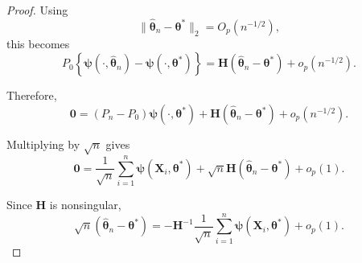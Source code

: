 \documentclass[pdflatex,sn-mathphys-ay]{sn-jnl}%
\let\oldtheta\theta
\renewcommand{\theta}{\boldsymbol{\oldtheta}}
\let\oldalpha\alpha
\renewcommand{\alpha}{\boldsymbol{\oldalpha}}
\theoremstyle{thmstyleone}%
\newtheorem{theorem}{Theorem}%
\theoremstyle{thmstyletwo}%
\theoremstyle{thmstylethree}%
\begin{document}
\begin{proof}
Using
\[
    \|
        \widehat{\boldsymbol{\theta}}_n
        -
        \boldsymbol{\theta}^*
    \|_2
    =
    O_p(n^{-1/2}),
\]
this becomes
\[
    P_0
    \left\{
        \boldsymbol{\psi}
        (\cdot,\widehat{\boldsymbol{\theta}}_n)
        -
        \boldsymbol{\psi}
        (\cdot,\boldsymbol{\theta}^*)
    \right\}
    =
    \mathbf{H}
    \left(
        \widehat{\boldsymbol{\theta}}_n
        -
        \boldsymbol{\theta}^*
    \right)
    +
    o_p(n^{-1/2}).
\]

Therefore,
\[
    \mathbf{0}
    =
    (P_n-P_0)
    \boldsymbol{\psi}
    (\cdot,\boldsymbol{\theta}^*)
    +
    \mathbf{H}
    \left(
        \widehat{\boldsymbol{\theta}}_n
        -
        \boldsymbol{\theta}^*
    \right)
    +
    o_p(n^{-1/2}).
\]

Multiplying by $\sqrt{n}$ gives
\[
    \mathbf{0}
    =
    \frac{1}{\sqrt{n}}
    \sum_{i=1}^n
    \boldsymbol{\psi}
    (\mathbf{X}_i,\boldsymbol{\theta}^*)
    +
    \sqrt{n}
    \mathbf{H}
    \left(
        \widehat{\boldsymbol{\theta}}_n
        -
        \boldsymbol{\theta}^*
    \right)
    +
    o_p(1).
\]

Since $\mathbf{H}$ is nonsingular,
\[
    \sqrt{n}
    \left(
        \widehat{\boldsymbol{\theta}}_n
        -
        \boldsymbol{\theta}^*
    \right)
    =
    -\mathbf{H}^{-1}
    \frac{1}{\sqrt{n}}
    \sum_{i=1}^n
    \boldsymbol{\psi}
    (\mathbf{X}_i,\boldsymbol{\theta}^*)
    +
    o_p(1).
\]

\end{proof}





\end{document}
